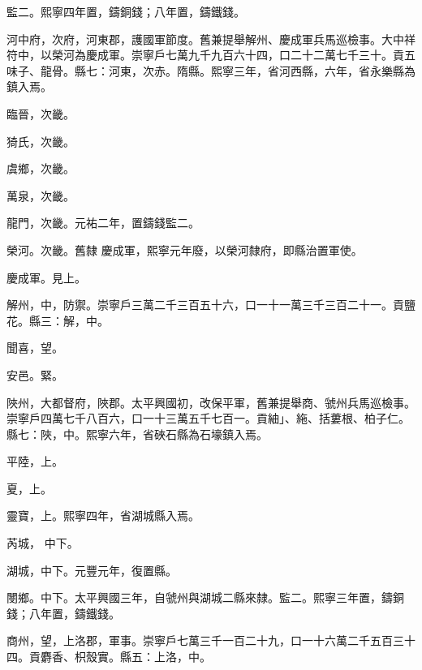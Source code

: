 \begin{pinyinscope}
 監二。熙寧四年置，鑄銅錢；八年置，鑄鐵錢。



 河中府，次府，河東郡，護國軍節度。舊兼提舉解州、慶成軍兵馬巡檢事。大中祥符中，以榮河為慶成軍。崇寧戶七萬九千九百六十四，口二十二萬七千三十。貢五味子、龍骨。縣七：河東，次赤。隋縣。熙寧三年，省河西縣，六年，省永樂縣為鎮入焉。



 臨晉，次畿。



 猗氏，次畿。



 虞鄉，次畿。



 萬泉，次畿。



 龍門，次畿。元祐二年，置鑄錢監二。



 榮河。次畿。舊隸
 慶成軍，熙寧元年廢，以榮河隸府，即縣治置軍使。



 慶成軍。見上。



 解州，中，防禦。崇寧戶三萬二千三百五十六，口一十一萬三千三百二十一。貢鹽花。縣三：解，中。



 聞喜，望。



 安邑。緊。



 陜州，大都督府，陜郡。太平興國初，改保平軍，舊兼提舉商、虢州兵馬巡檢事。崇寧戶四萬七千八百六，口一十三萬五千七百一。貢紬」、絁、括蔞根、柏子仁。縣七：陜，中。熙寧六年，省硤石縣為石壕鎮入焉。



 平陸，上。



 夏，上。



 靈寶，上。熙寧四年，省湖城縣入焉。



 芮城，
 中下。



 湖城，中下。元豐元年，復置縣。



 閿鄉。中下。太平興國三年，自虢州與湖城二縣來隸。監二。熙寧三年置，鑄銅錢；八年置，鑄鐵錢。



 商州，望，上洛郡，軍事。崇寧戶七萬三千一百二十九，口一十六萬二千五百三十四。貢麝香、枳殼實。縣五：上洛，中。




\end{pinyinscope}
